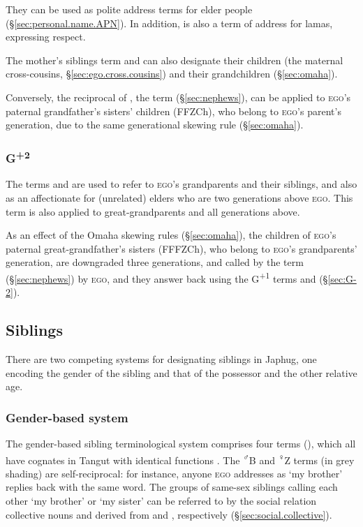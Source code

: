 They can be used as polite address terms for elder people (§\ref{sec:personal.name.APN}). In addition,  is also a term of address for lamas, expressing respect.

The mother's siblings term  and   can also designate their children (the maternal cross-cousins, §\ref{sec:ego.cross.cousins}) and their grandchildren (§\ref{sec:omaha}).

Conversely, the reciprocal of , the term  (§\ref{sec:nephews}), can be applied to \textsc{ego}'s paternal grandfather's sisters' children (FFZCh), who belong to \textsc{ego}'s parent's generation, due to the same generational skewing rule (§\ref{sec:omaha}).

\subsubsection{G\textsuperscript{+2}} \label{sec:G+2}
The terms  and  are used to refer to \textsc{ego}'s grandparents and their siblings, and also as an affectionate for (unrelated) elders who are two generations above \textsc{ego}. This term is also applied to great-grandparents and all generations above.

As an effect of the Omaha skewing rules (§\ref{sec:omaha}), the children of \textsc{ego}'s paternal great-grandfather's sisters (FFFZCh), who belong to \textsc{ego}'s grandparents' generation, are downgraded three generations, and called by the term  (§\ref{sec:nephews}) by \textsc{ego}, and they answer back using the G\textsuperscript{+1} terms  and   (§\ref{sec:G-2}).

\subsection{Siblings} \label{sec:siblings}
There are two competing systems for designating siblings in Japhug, one encoding the gender of the sibling and that of the possessor and the other relative age.



\subsubsection{Gender-based system} \label{sec:siblings.gender}
The gender-based sibling terminological system comprises four terms (), which all have cognates in Tangut with identical functions \citep{jacques12kinship}. The \textsuperscript{♂}B and \textsuperscript{♀}Z terms (in grey shading) are self-reciprocal: for instance, anyone \textsc{ego} addresses as  `my brother' replies back with the same word. The groups of same-sex siblings calling each other  `my brother' or  `my sister' can be referred to by the social relation collective nouns  and  derived from  and , respectively  (§\ref{sec:social.collective}).

